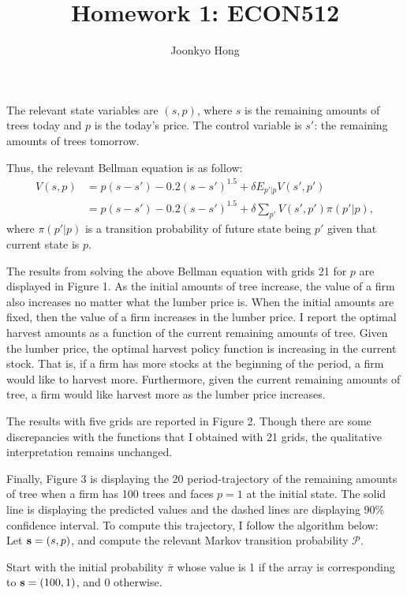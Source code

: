 \documentclass[10pt, letterpaper]{article}
\begin{document}
\title{Homework 1: ECON512}
\author{Joonkyo Hong}
\date{}
\maketitle
\smallskip

\noindent The relevant state variables are $(s,p)$, where $s$ is the remaining amounts of trees today and $p$ is the today's price. The control variable is $s'$: the remaining amounts of trees tomorrow.

Thus, the relevant Bellman equation is as follow:
\begin{align*}
V(s,p) & = p(s-s') - 0.2(s-s')^{1.5} + \delta E_{p'|p} V(s',p') \\
       & = p(s-s') - 0.2(s-s')^{1.5} + \delta \sum_{p'} V(s',p')\pi(p'|p), 
\end{align*}
where $\pi(p'|p)$ is a transition probability of future state being $p'$ given that current state is $p$.

The results from solving the above Bellman equation with grids 21 for $p$ are displayed in Figure 1. As the initial amounts of tree increase, the value of a firm also increases no matter what the lumber price is. When the initial amounts are fixed, then the value of a firm increases in the lumber price. I report the optimal harvest amounts as a function of the current remaining amounts of tree. Given the lumber price, the optimal harvest policy function is increasing in the current stock. That is, if a firm has more stocks at the beginning of the period, a firm would like to harvest more. Furthermore, given the current remaining amounts of tree, a firm would like harvest more as the lumber price increases.

The results with five grids are reported in Figure 2. Though there are some discrepancies with the functions that I obtained with 21 grids, the qualitative interpretation remains unchanged.

Finally, Figure 3 is displaying the 20 period-trajectory of the remaining amounts of tree when a firm has 100 trees and faces $p=1$ at the initial state. The solid line is displaying the predicted values and the dashed lines are displaying 90\% confidence interval. To compute this trajectory, I follow the algorithm below:\\

\noindent [1] Let $\bold{s} = (s,p)$, and compute the relevant Markov transition probability ${\mathcal P}$.

\noindent [2] Start with the initial probability $\bar{\pi}$ whose value is 1 if the array is corresponding to $\bold{s} = (100,1)$, and 0 otherwise.
\end{document}
